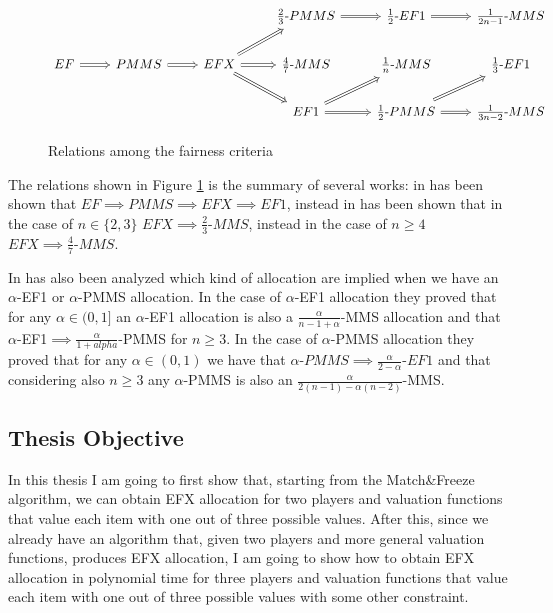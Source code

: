 \begin{figure}[h]
\[\begin{tikzcd}
  &&& {\frac{2}{3}\text{-}PMMS} & {\frac{1}{2}\text{-}EF1} & {\frac{1}{2n-1}\text{-}MMS} \\
  EF & PMMS & EFX & {\frac{4}{7}\text{-}MMS } & {\frac{1}{n}\text{-}MMS} & {\frac{1}{3}\text{-}EF1} \\
  &&& EF1 & {\frac{1}{2}\text{-}PMMS} & {\frac{1}{3n-2}\text{-}MMS}
  \arrow[Rightarrow, from=2-1, to=2-2]
  \arrow[Rightarrow, from=2-3, to=2-4]
  \arrow[Rightarrow, from=2-3, to=1-4]
  \arrow[Rightarrow, from=2-3, to=3-4]
  \arrow[Rightarrow, from=1-4, to=1-5]
  \arrow[Rightarrow, from=1-5, to=1-6]
  \arrow[Rightarrow, from=3-4, to=3-5]
  \arrow[Rightarrow, from=3-4, to=2-5]
  \arrow[Rightarrow, from=3-5, to=3-6]
  \arrow[Rightarrow, from=3-5, to=2-6]
  \arrow[Rightarrow, from=2-2, to=2-3]
\end{tikzcd}
\]
\caption{Relations among the fairness criteria}
\label{fig:relations-fairness-criteria}
\end{figure}
The relations shown in Figure \ref{fig:relations-fairness-criteria} is the summary of several works: in \cite{DBLP:/CaragiannisKMP016-EFX-PMMS} has been shown that $EF\implies PMMS\implies EFX \implies EF1$, instead in \cite{DBLP:ComparingApproximateRelaxationsofEnvy-Freeness} has been shown that in the case of $n\in \{2,3\}$ $EFX\implies \frac{2}{3}\textit{-MMS}$, instead in the case of $n\ge 4$ $EFX\implies \frac{4}{7}\textit{-MMS}$. 

In \cite{DBLP:ComparingApproximateRelaxationsofEnvy-Freeness} has also been analyzed which kind of allocation are implied when we have an $\alpha$-EF1 or $\alpha$-PMMS allocation.
In the case of $\alpha$-EF1 allocation they proved that for any $\alpha\in (0,1]$ an $\alpha$-EF1 allocation is also a $\frac{\alpha}{n-1+\alpha}$-MMS allocation and that $\alpha$-EF1$\implies \frac{\alpha}{1+alpha}$-PMMS for $n\ge 3$.
In the case of $\alpha$-PMMS allocation they proved that for any $\alpha\in (0,1)$ we have that $\alpha\textit{-}PMMS\implies \frac{\alpha}{2-\alpha}\textit{-}EF1$ and that considering also $n\ge 3$ any $\alpha$-PMMS is also an $\frac{\alpha}{2(n-1) -\alpha(n-2)}$-MMS.

\subsection{Thesis Objective}
In this thesis I am going to first show that, starting from the Match\&Freeze algorithm, we can obtain EFX allocation for two players and valuation functions that value each item with one out of three possible values. After this, since we already have an algorithm that, given two players and more general valuation functions, produces EFX allocation, I am going to show how to obtain EFX allocation in polynomial time for three players and valuation functions that value each item with one out of three possible values with some other constraint.